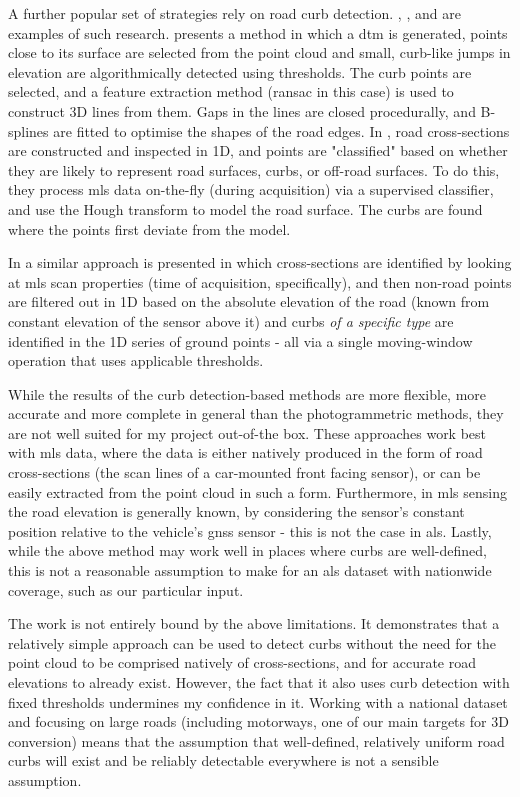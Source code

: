 A further popular set of strategies rely on road curb detection. \cite{vosselman_zhou_2009}, \cite{zhang_2010}, and \cite{yang_etal_2013} are examples of such research. \cite{vosselman_zhou_2009} presents a method in which a \ac{dtm} is generated, points close to its surface are selected from the point cloud and small, curb-like jumps in elevation are algorithmically detected using thresholds. The curb points are selected, and a feature extraction method (\ac{ransac} in this case) is used to construct 3D lines from them. Gaps in the lines are closed procedurally, and B-splines are fitted to optimise the shapes of the road edges. In \cite{zhang_2010}, road cross-sections are constructed and inspected in 1D, and points are "classified" based on whether they are likely to represent road surfaces, curbs, or off-road surfaces. To do this, they process \ac{mls} data on-the-fly (during acquisition) via a supervised classifier, and use the Hough transform to model the road surface. The curbs are found where the points first deviate from the model.

In \cite{yang_etal_2013} a similar approach is presented in which cross-sections are identified by looking at \ac{mls} scan properties (time of acquisition, specifically), and then non-road points are filtered out in 1D based on the absolute elevation of the road (known from constant elevation of the sensor above it) and curbs \textit{of a specific type} are identified in the 1D series of ground points - all via a single moving-window operation that uses applicable thresholds.

While the results of the curb detection-based methods are more flexible, more accurate and more complete in general than the photogrammetric methods, they are not well suited for my project out-of-the box. These approaches work best with \ac{mls} data, where the data is either natively produced in the form of road cross-sections (the scan lines of a car-mounted front facing sensor), or can be easily extracted from the point cloud in such a form. Furthermore, in \ac{mls} sensing the road elevation is generally known, by considering the sensor's constant position relative to the vehicle's \ac{gnss} sensor - this is not the case in \ac{als}. Lastly, while the above method may work well in places where curbs are well-defined, this is not a reasonable assumption to make for an \ac{als} dataset with nationwide coverage, such as our particular input.

The work \cite{vosselman_zhou_2009} is not entirely bound by the above limitations. It demonstrates that a relatively simple approach can be used to detect curbs without the need for the point cloud to be comprised natively of cross-sections, and for accurate road elevations to already exist. However, the fact that it also uses curb detection with fixed thresholds undermines my confidence in it. Working with a national dataset and focusing on large roads (including motorways, one of our main targets for 3D conversion) means that the assumption that well-defined, relatively uniform road curbs will exist and be reliably detectable everywhere is not a sensible assumption.


